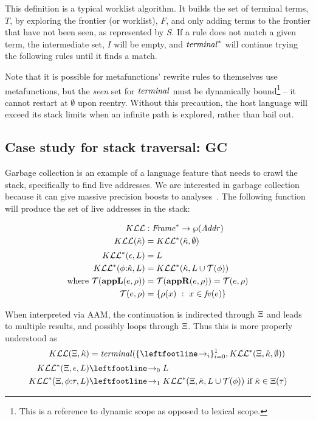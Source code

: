 This definition is a typical worklist algorithm.
%
It builds the set of terminal terms, $T$, by exploring the frontier (or worklist), $F$, and only adding terms to the frontier that have not been seen, as represented by $S$.
%
If a rule does not match a given term, the intermediate set, $I$ will be empty, and $\mathit{terminal}^*$ will continue trying the following rules until it finds a match.
%

%
Note that it is possible for metafunctions' rewrite rules to themselves use metafunctions, but the \emph{seen} set for $\mathit{terminal}$ must be dynamically bound\footnote{This is a reference to dynamic scope as opposed to lexical scope.} -- it cannot restart at $\emptyset$ upon reentry.
%
Without this precaution, the host language will exceed its stack limits when an infinite path is explored, rather than bail out.

\subsection{Case study for stack traversal: GC}
Garbage collection is an example of a language feature that needs to crawl the stack, specifically to find live addresses.
%
We are interested in garbage collection because it can give massive precision boosts to analyses~\citep{dvanhorn:Might:2006:GammaCFA,dvanhorn:Earl2012Introspective}.
%
The following function will produce the set of live addresses in the stack:

\begin{align*}
  K{\mathcal L}{\mathcal L} &: \mathit{Frame}^* \to \wp(\mathit{Addr}) \\
  K{\mathcal L}{\mathcal L}({\hat{\kappa}}) &= K{\mathcal L}{\mathcal L}^*({\hat{\kappa}},\emptyset) \\[2pt]
  K{\mathcal L}{\mathcal L}^*(\epsilon,L) &= L \\
  K{\mathcal L}{\mathcal L}^*(\phi{\tt :} {\hat{\kappa}}, L) &= K{\mathcal L}{\mathcal L}^*({\hat{\kappa}}, L\cup{\mathcal T}(\phi)) \\
  \text{where } {\mathcal T}(\mathbf{appL}(e,\rho)) &= {\mathcal T}(\mathbf{appR}(e,\rho)) = {\mathcal T}(e,\rho) \\
                {\mathcal T}(e,\rho) &= \{ \rho(x)\ :\ x \in \mathit{fv}(e)\}
\end{align*}

When interpreted via AAM, the continuation is indirected through $\Xi$ and leads to multiple results, and possibly loops through $\Xi$.
%
Thus this is more properly understood as
\begin{align*}
  \kontlive(\mktab,\makont) &= \terminal(\set{\stepto_i}_{i=0}^1, \kontliveaux(\mktab,\makont,\emptyset)) \\[2pt]
  \kontliveaux(\mktab,\epsilon,L) &\stepto_0 L \\
  \kontliveaux(\mktab,\kcons{\mkframe}{\mctx}, L) &\stepto_1 \kontliveaux(\mktab,\makont, L\cup\touches(\mkframe)) \text{ if } \makont \in \mktab(\mctx)
\end{align*}
%

